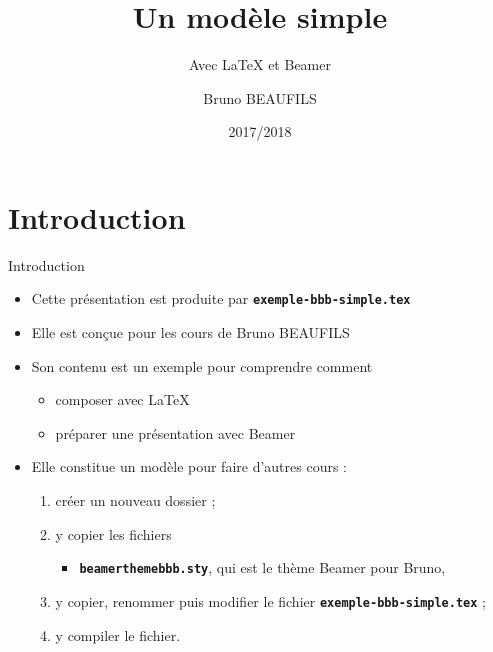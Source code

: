 \documentclass[10pt,t]{beamer}
\title[Cours]{Un modèle simple}
\subtitle{Avec \LaTeX{} et Beamer}
\author{Bruno BEAUFILS}
\institute[]{Université Lille~1 \and IUT «A»}
\date{2017/2018}
\begin{document}
\maketitle


\section{Introduction}

\begin{frame}{Introduction} 

  \begin{itemize}
  \item Cette présentation est produite par \texttt{\textbf{exemple-bbb-simple.tex}}
  \item Elle est conçue pour les cours de Bruno BEAUFILS
  \item Son contenu est un exemple pour comprendre comment

    \begin{itemize}
    \item composer avec \LaTeX{}
    \item préparer une présentation avec Beamer
    \end{itemize}

  \end{itemize}

  \pause


  \begin{itemize}
  \item Elle constitue un modèle pour faire d'autres cours :
      
    \begin{enumerate}
    \item créer un nouveau dossier ;
    \item y copier les fichiers 
      
      \begin{itemize}
      \item \texttt{\textbf{beamerthemebbb.sty}}, qui est le thème Beamer pour Bruno,
      \end{itemize}
      
    \item y copier, renommer puis modifier le fichier \texttt{\textbf{exemple-bbb-simple.tex}} ;
    \item y compiler le fichier.
    \end{enumerate}
  \end{itemize}
\end{frame}
\end{document}
